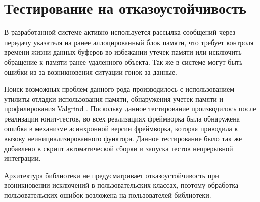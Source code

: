 \section{Тестирование на отказоустойчивость}

В разработанной системе активно используется рассылка сообщений 
через передачу указателя на ранее аллоцированный блок памяти, 
что требует контроля времени жизни данных буферов во избежании 
утечек памяти или исключить обращение к памяти ранее удаленного 
объекта. Так же в системе могут быть ошибки из-за возникновения 
ситуации гонок за данные.

Поиск возможных проблем данного рода производилось с 
использованием утилиты отладки использования памяти, обнаружения 
учетек памяти и профилирования Valgrind 
\cite{nethercote2007valgrind}. Поскольку данное тестирование 
производилось после реализации юнит-тестов, во всех реализациях 
фреймворка была обнаружена ошибка в механизме асинхронной версии 
фреймворка, которая приводила к вызову неинициализированного 
функтора. Данное тестирование было так же добавлено в скрипт 
автоматической сборки и запуска тестов непрерывной интеграции.

Архитектура библиотеки не предусматривает отказоустойчивость при возникновении исключений в пользовательских классах, поэтому обработка пользовательских ошибок возложена на пользователей библиотеки.